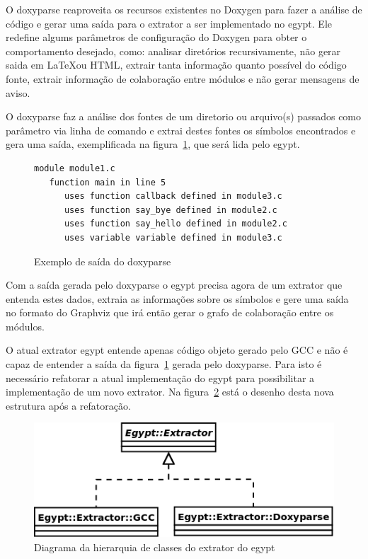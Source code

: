 O doxyparse reaproveita os recursos existentes no Doxygen para fazer a
análise de código e gerar uma saída para o extrator a ser implementado no
egypt. Ele redefine algums parâmetros de configuração do Doxygen para obter o
comportamento desejado, como: analisar diretórios recursivamente, não gerar
saida em \LaTeX ou HTML, extrair tanta informação quanto possível do código
fonte, extrair informação de colaboração entre módulos e não gerar mensagens de
aviso.

O doxyparse faz a análise dos fontes de um diretorio ou arquivo(s) passados
como parâmetro via linha de comando e extrai destes fontes os símbolos
encontrados e gera uma saída, exemplificada na
figura~\ref{exemplo-saida-doxyparse}, que será lida pelo egypt.

\begin{figure}[h]
\begin{Verbatim}[frame=single,fontsize=\relsize{-2},fontfamily=courier]
module module1.c
   function main in line 5
      uses function callback defined in module3.c
      uses function say_bye defined in module2.c
      uses function say_hello defined in module2.c
      uses variable variable defined in module3.c
\end{Verbatim}
\caption{Exemplo de saída do doxyparse}
\label{exemplo-saida-doxyparse}
\end{figure}

Com a saída gerada pelo doxyparse o egypt precisa agora de um extrator que
entenda estes dados, extraia as informações sobre os símbolos e gere uma saída no
formato do Graphviz que irá então gerar o grafo de colaboração entre os módulos.

O atual extrator egypt entende apenas código objeto gerado pelo GCC e não é
capaz de entender a saída da figura~\ref{exemplo-saida-doxyparse} gerada pelo
doxyparse. Para isto é necessário refatorar a atual implementação do egypt para
possibilitar a implementação de um novo extrator. Na
figura~\ref{egypt-diagram-extractor} está o desenho desta nova estrutura após a
refatoração.

\begin{figure}[h]
\center
\includegraphics[scale=0.4]{imagens/egypt-diagram-extractor}
\caption{Diagrama da hierarquia de classes do extrator do egypt}
\label{egypt-diagram-extractor}
\end{figure}

